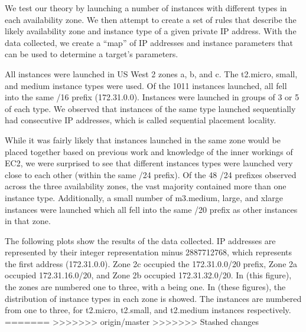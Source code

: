 \documentclass[conference]{IEEEtran}
\begin{document}
We test our theory by launching a number of instances with different types in each availability zone. 
We then attempt to create a set of rules that describe the likely availability zone and instance type of a given 
private IP address.  
With the data collected, we create a “map” of IP addresses and instance parameters that can be used to determine 
a target’s parameters.

All instances were launched in US West 2 zones a, b, and c. The t2.micro, small, and medium instance types 
were used. 
Of the 1011 instances launched, all fell into the same /16 prefix (172.31.0.0). 
Instances were launched 
in groups of 3 or 5 of each type. 
We observed that instances of the same type launched sequentially had consecutive IP addresses, which is called 
sequential placement locality. 

While it was fairly likely that instances launched in the same zone would be placed together based on previous 
work and knowledge of the inner workings of EC2, we were surprised to see that different instances types were launched 
very close to each other (within the same /24 prefix). 
Of the 48 /24 prefixes observed across the three availability zones, the vast majority contained more than one 
instance type. 
Additionally, a small number of m3.medium, large, and xlarge instances were launched which all fell into the same 
/20 prefix as other instances in that zone.

The following plots show the results of the data collected. 
IP addresses are represented by their integer representation minus 2887712768, which represents the first address 
(172.31.0.0). 
Zone 2c occupied the 172.31.0.0/20 prefix, Zone 2a occupied 172.31.16.0/20, and Zone 2b occupied 172.31.32.0/20. 
In (this figure), the zones are numbered one to three, with a being one.
In (these figures), the distribution of instance types in each zone is showed. The instances are numbered from 
one to three, for t2.micro, t2.small, and t2.medium instances respectively.
=======
>>>>>>> origin/master
>>>>>>> Stashed changes
\end{document}
